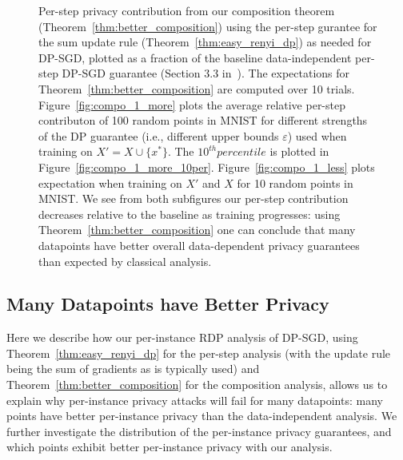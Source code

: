 \begin{figure}[!t]

\centering
{}
\caption{Per-step privacy contribution from our composition theorem (Theorem~\ref{thm:better_composition}) using the per-step gurantee for the sum update rule (Theorem~\ref{thm:easy_renyi_dp}) as needed for DP-SGD, plotted as a fraction of the baseline data-independent per-step DP-SGD guarantee (Section 3.3 in~\citet{mironov2019r}). %
The expectations for Theorem~\ref{thm:better_composition} are computed over 10 trials. Figure~\ref{fig:compo_1_more} plots the average relative per-step contributon of 100 random points in MNIST for different strengths of the DP guarantee (i.e., different upper bounds $\varepsilon$) used when training on $X' = X \cup \{x^*\}$. The $10^{th} percentile$ is plotted in Figure~\ref{fig:compo_1_more_10per}. Figure~\ref{fig:compo_1_less} plots expectation when training on $X'$ and $X$ for 10 random points in MNIST. We see from both subfigures our per-step contribution decreases relative to the baseline as training progresses: using Theorem~\ref{thm:better_composition} one can conclude that many datapoints have better overall data-dependent privacy guarantees than expected by classical analysis.
}


\label{fig:composition}
\end{figure}

\subsection{Many Datapoints have Better Privacy}
\label{ssec:exp_better_privacy}




Here we describe how our per-instance RDP analysis of DP-SGD, using Theorem~\ref{thm:easy_renyi_dp} for the per-step analysis (with the update rule being the sum of gradients as is typically used) and Theorem~\ref{thm:better_composition} for the composition analysis, allows us to explain why per-instance privacy attacks will fail for many datapoints: many points have better per-instance privacy than the data-independent analysis. We further investigate the distribution of the per-instance privacy guarantees, and which points exhibit better per-instance privacy with our analysis.

